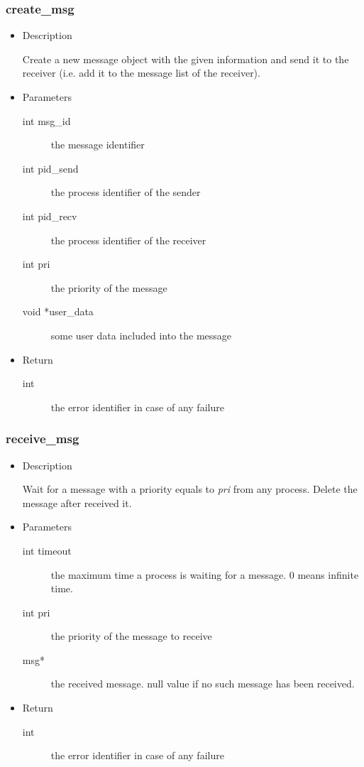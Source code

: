 \subsubsection{create\_msg}
\begin{itemize}
\item{Description}

	Create a new message object with the given information and send it to
	the receiver (i.e. add it to the message list of the receiver).
\item{Parameters}
	\begin{description}
	\item[int msg\_id] the message identifier
	\item[int pid\_send] the process identifier of the sender
	\item[int pid\_recv] the process identifier of the receiver
	\item[int pri] the priority of the message
	\item[void *user\_data] some user data included into the message
	\end{description}
\item{Return}
	\begin{description}
	\item[int] the error identifier in case of any failure
	\end{description}
\end{itemize}

\subsubsection{receive\_msg}
\begin{itemize}
\item{Description}

	Wait for a message with a priority equals to \textit{pri} from any
	process. Delete the message after received it.
\item{Parameters}
	\begin{description}
	\item[int timeout] the maximum time a process is waiting for a message. 0 means infinite time.
	\item[int pri] the priority of the message to receive
	\item[msg*] the received message. null value if no such
		message has been received.
	\end{description}
\item{Return}
	\begin{description}
	\item[int] the error identifier in case of any failure
	\end{description}
\end{itemize}


